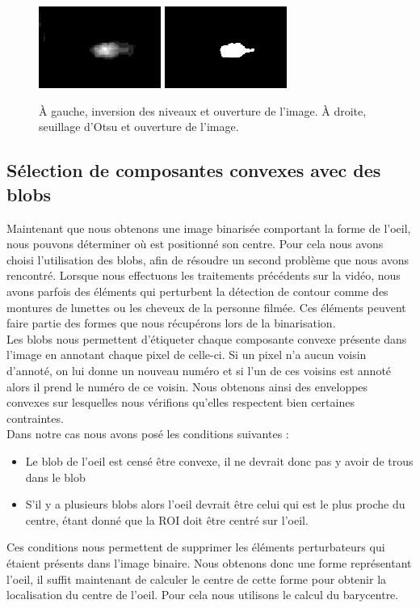 \begin{figure}[H]
  \centering
  \includegraphics[width=4cm]{image/008/ycbcr_inv_open.png}
  \includegraphics[width=4cm]{image/008/ycbcr_bin_open.png}
  \caption{À gauche, inversion des niveaux et ouverture de l'image. À droite, seuillage d'Otsu et ouverture de l'image.}
\end{figure}

\subsection{Sélection de composantes convexes avec des blobs}
Maintenant que nous obtenons une image binarisée comportant la forme de l'oeil, nous pouvons déterminer où est
positionné son centre. Pour cela nous avons choisi l'utilisation des blobs, afin de résoudre un second 
problème que nous avons rencontré. Lorsque nous effectuons les traitements précédents sur la vidéo, nous avons
parfois des éléments qui perturbent la détection de contour comme des montures de lunettes ou les cheveux de la personne 
filmée. Ces éléments peuvent faire partie des formes que nous récupérons lors de la binarisation.\\ 

Les blobs nous permettent d'étiqueter chaque composante convexe présente dans l'image en annotant
chaque pixel de celle-ci. Si un pixel n'a aucun voisin d'annoté, on lui donne un nouveau numéro et si
l'un de ces voisins est annoté alors il prend le numéro de ce voisin. Nous obtenons ainsi des enveloppes
convexes sur lesquelles nous vérifions qu'elles respectent bien certaines contraintes.\\

Dans notre cas nous avons posé les conditions suivantes :
\begin{itemize}
 \item Le blob de l'oeil est censé être convexe, il ne devrait donc pas y avoir de trous dans le blob
 \item S'il y a plusieurs blobs alors l'oeil devrait être celui qui est le plus proche du centre, étant
 donné que la ROI doit être centré sur l'oeil.
\end{itemize}
Ces conditions nous permettent de supprimer les éléments perturbateurs qui étaient présents dans l'image binaire.
Nous obtenons donc une forme représentant l'oeil, il suffit maintenant de calculer le centre de cette forme
pour obtenir la localisation du centre de l'oeil. Pour cela nous utilisons le calcul du barycentre.